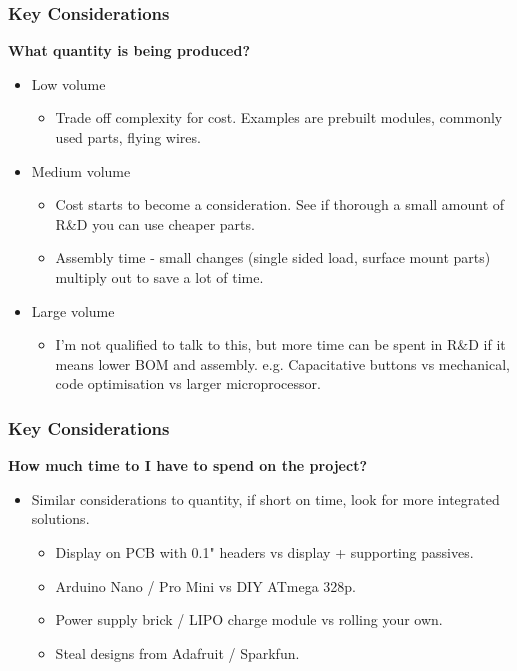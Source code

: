 \documentclass[t]{beamer}
\begin{document}

\begin{frame}
\frametitle{Key Considerations}
\large{\textbf{What quantity is being produced?}}
\vspace{1mm}
\begin{itemize}
	\item Low volume 
	\begin{itemize}
		\item Trade off complexity for cost. Examples are prebuilt modules, commonly used parts, flying wires.
	\end{itemize} 
	\item Medium volume
	\begin{itemize}
		\item Cost starts to become a consideration. See if thorough a small amount of R\&D you can use cheaper parts.
		\item Assembly time - small changes (single sided load, surface mount parts) multiply out to save a lot of time.
	\end{itemize}
	\item Large volume
	\begin{itemize}
		\item I'm not qualified to talk to this, but more time can be spent in R\&D if it means lower BOM and assembly. e.g. Capacitative buttons vs mechanical, code optimisation vs larger microprocessor. 
	\end{itemize}
\end{itemize}
\end{frame}


\begin{frame}
\frametitle{Key Considerations}
\large{\textbf{How much time to I have to spend on the project?}}
\vspace{1mm}

\begin{itemize}
	\item Similar considerations to quantity, if short on time, look for more integrated solutions. 
	\begin{itemize}
		\item Display on PCB with 0.1" headers vs display + supporting passives.  
		\item Arduino Nano / Pro Mini vs DIY ATmega 328p.
		\item Power supply brick / LIPO charge module vs rolling your own. 
		\item Steal designs from Adafruit / Sparkfun. 
	\end{itemize}
\end{itemize}
\end{frame}
\end{document}
